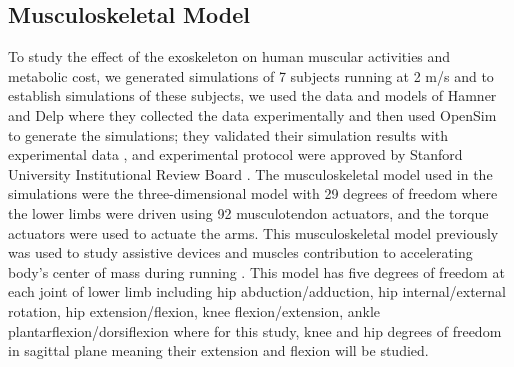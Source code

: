 \documentclass[10pt,letterpaper]{article}
\begin{document}
\subsection*{Musculoskeletal Model}
To study the effect of the exoskeleton on human muscular activities and metabolic cost, we generated simulations of 7 subjects running at 2 m/s and to establish simulations of these subjects, we used the data and models of Hamner and Delp\cite{101} where they  collected the data experimentally and then used OpenSim to generate the simulations; they validated their simulation results with experimental data \cite{101}, and experimental protocol were approved by Stanford University Institutional Review Board \cite{2}. The musculoskeletal model used in the simulations were the three-dimensional model with 29 degrees of freedom where the lower limbs were driven using 92 musculotendon actuators, and the torque actuators were used to actuate the arms. This musculoskeletal model previously was used to study assistive devices \cite{2} and muscles contribution to accelerating body's center of mass during running \cite{101,102}. This model has five degrees of freedom at each joint of lower limb including hip abduction/adduction, hip internal/external rotation, hip extension/flexion, knee flexion/extension, ankle plantarflexion/dorsiflexion where  for this study, knee and hip degrees of freedom in sagittal plane meaning their extension and flexion will be studied.\\
\end{document}
